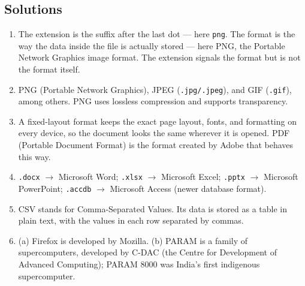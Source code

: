 \documentclass[11pt]{article}
\begin{document}
\subsection*{Solutions}
\begingroup\small
\begin{enumerate}[label=\arabic*.]
  \item The extension is the suffix after the last dot --- here
    \texttt{png}. The format is the way the data inside the file is actually
    stored --- here PNG, the Portable Network Graphics image format. The
    extension signals the format but is not the format itself.
  \item PNG (Portable Network Graphics), JPEG (\texttt{.jpg/.jpeg}), and GIF
    (\texttt{.gif}), among others. PNG uses lossless compression and supports
    transparency.
  \item A fixed-layout format keeps the exact page layout, fonts, and
    formatting on every device, so the document looks the same wherever it is
    opened. PDF (Portable Document Format) is the format created by Adobe
    that behaves this way.
  \item \texttt{.docx} $\rightarrow$ Microsoft Word; \texttt{.xlsx}
    $\rightarrow$ Microsoft Excel; \texttt{.pptx} $\rightarrow$ Microsoft
    PowerPoint; \texttt{.accdb} $\rightarrow$ Microsoft Access (newer
    database format).
  \item CSV stands for Comma-Separated Values. Its data is stored as a table
    in plain text, with the values in each row separated by commas.
  \item (a) Firefox is developed by Mozilla. (b) PARAM is a family of
    supercomputers, developed by C-DAC (the Centre for Development of
    Advanced Computing); PARAM 8000 was India's first indigenous
    supercomputer.
\end{enumerate}
\endgroup
\end{document}
